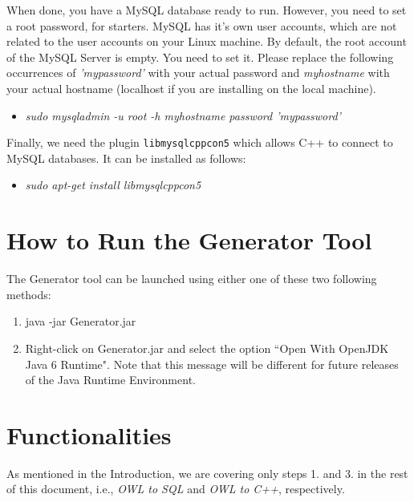 \documentclass[12pt]{article}
\begin{document}
When done, you have a MySQL database ready to run. However, you need to set a root password, for starters.
MySQL has it's own user accounts, which are not related to the user accounts on your Linux machine.
By default, the root account of the MySQL Server is empty. You need to set it.
Please replace the following occurrences of \textit{'mypassword'} with your actual password and \textit{myhostname} with your actual hostname (localhost if you are installing on the local machine).

\begin{itemize}
 \item \textit{sudo mysqladmin -u root -h myhostname password 'mypassword'}
\end{itemize}

Finally, we need the plugin \texttt{libmysqlcppcon5} which allows C++ to connect to MySQL databases. It can be installed as follows:
\begin{itemize}
 \item \textit{sudo apt-get install libmysqlcppcon5}
\end{itemize}

\section{How to Run the Generator Tool}\label{s:run}
The Generator tool can be launched using either one of these two following methods:
\begin{enumerate}
 \item java -jar Generator.jar
 \item Right-click on Generator.jar and select the option ``Open With OpenJDK Java 6 Runtime". Note that this message will be different for future releases of the Java Runtime Environment.
\end{enumerate}


\section{Functionalities}\label{s:generator}
As mentioned in the Introduction, we are covering only steps 1. and 3. in the rest of this document, i.e., \textit{OWL to SQL} and \textit{OWL to C++}, respectively.
\end{document}
